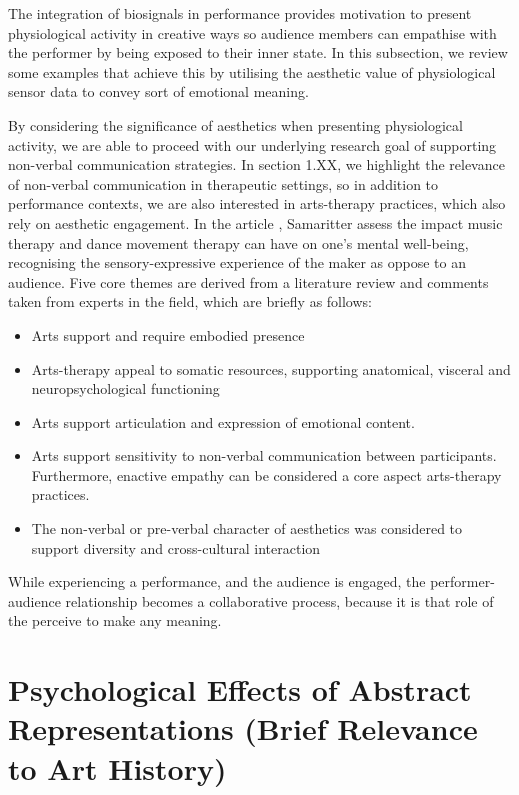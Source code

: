 The integration of biosignals in performance provides motivation to present physiological activity in creative ways so audience members can empathise with the performer by being exposed to their inner state. In this subsection, we review some examples that achieve this by utilising the aesthetic value of physiological sensor data to convey sort of emotional meaning. 

By considering the significance of aesthetics when presenting physiological activity, we are able to proceed with our underlying research goal of supporting non-verbal communication strategies. In section 1.XX, we highlight the relevance of non-verbal communication in therapeutic settings, so in addition to performance contexts, we are also interested in arts-therapy practices, which also rely on aesthetic engagement. In the article \cite{samaritter_aesthetic_2018}, Samaritter assess the impact music therapy and dance movement therapy can have on one's mental well-being, recognising the sensory-expressive experience of the maker as oppose to an audience.  Five core themes are derived from a literature review and comments taken from experts in the field, which are briefly as follows:

\begin{itemize}
\item Arts support and require embodied presence
\item Arts-therapy appeal to somatic resources, supporting anatomical, visceral and neuropsychological functioning
\item Arts support articulation and expression of emotional content.
\item Arts support sensitivity to non-verbal communication between participants. Furthermore, enactive empathy can be considered a core aspect arts-therapy practices.
\item The non-verbal or pre-verbal character of aesthetics was considered to support diversity and cross-cultural interaction
\end{itemize}

While experiencing a performance, and the audience is engaged, the performer-audience relationship becomes a collaborative process, because it is that role of the perceive to make any meaning.

\section{Psychological Effects of Abstract Representations (Brief Relevance to Art History)}
\label{lit_review:psychology_aesthetics}

